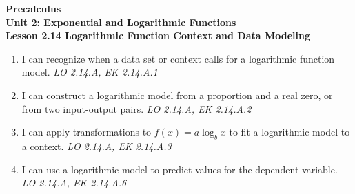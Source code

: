 \documentclass[10pt]{article}
\begin{document}
\vspace{-0.8in}

\begin{center}
  {\color{white}\textbf{\LARGE Precalculus}}\\[4pt]
  {\color{skymid}\large\textbf{Unit 2: Exponential and Logarithmic Functions}}\\[6pt]
  {\color{white}\textbf{\large Lesson 2.14 \quad Logarithmic Function Context and Data Modeling}}
\end{center}

\vspace{0.22in}
\namedateperiod
\vspace{0.18in}

\begin{learningtargetbox}
\small
\begin{enumerate}[leftmargin=1.5em, itemsep=5pt]
  \item I can recognize when a data set or context calls for a logarithmic function model.
        \hfill\textit{LO 2.14.A, EK 2.14.A.1}
  \item I can construct a logarithmic model from a proportion and a real zero, or from two
        input-output pairs.
        \hfill\textit{LO 2.14.A, EK 2.14.A.2}
  \item I can apply transformations to $f(x) = a\log_b x$ to fit a logarithmic model to
        a context.
        \hfill\textit{LO 2.14.A, EK 2.14.A.3}
  \item I can use a logarithmic model to predict values for the dependent variable.
        \hfill\textit{LO 2.14.A, EK 2.14.A.6}
\end{enumerate}
\end{learningtargetbox}

\vspace{0.14in}
\end{document}
